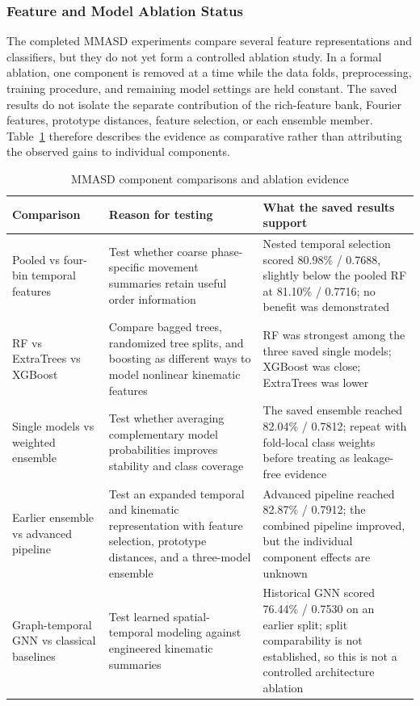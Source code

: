 \documentclass[a4paper,12pt]{report}
\begin{document}
\subsubsection*{Feature and Model Ablation Status}

The completed MMASD experiments compare several feature representations and classifiers, but they do not yet form a controlled ablation study. In a formal ablation, one component is removed at a time while the data folds, preprocessing, training procedure, and remaining model settings are held constant. The saved results do not isolate the separate contribution of the rich-feature bank, Fourier features, prototype distances, feature selection, or each ensemble member. Table~\ref{tab:mmasd_ablation_status} therefore describes the evidence as comparative rather than attributing the observed gains to individual components.

\begin{table}[htbp]
\centering
\small
\caption{MMASD component comparisons and ablation evidence}
\label{tab:mmasd_ablation_status}
\begin{tabular}{p{3.5cm}p{6.0cm}p{4.0cm}}
\hline
\textbf{Comparison} & \textbf{Reason for testing} & \textbf{What the saved results support} \\
\hline
Pooled vs four-bin temporal features & Test whether coarse phase-specific movement summaries retain useful order information & Nested temporal selection scored 80.98\% / 0.7688, slightly below the pooled RF at 81.10\% / 0.7716; no benefit was demonstrated \\
RF vs ExtraTrees vs XGBoost & Compare bagged trees, randomized tree splits, and boosting as different ways to model nonlinear kinematic features & RF was strongest among the three saved single models; XGBoost was close; ExtraTrees was lower \\
Single models vs weighted ensemble & Test whether averaging complementary model probabilities improves stability and class coverage & The saved ensemble reached 82.04\% / 0.7812; repeat with fold-local class weights before treating as leakage-free evidence \\
Earlier ensemble vs advanced pipeline & Test an expanded temporal and kinematic representation with feature selection, prototype distances, and a three-model ensemble & Advanced pipeline reached 82.87\% / 0.7912; the combined pipeline improved, but the individual component effects are unknown \\
Graph-temporal GNN vs classical baselines & Test learned spatial-temporal modeling against engineered kinematic summaries & Historical GNN scored 76.44\% / 0.7530 on an earlier split; split comparability is not established, so this is not a controlled architecture ablation \\
\hline
\end{tabular}
\end{table}
\end{document}
